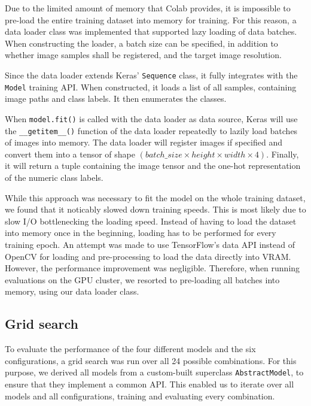 \documentclass{l4proj}
\begin{document}
Due to the limited amount of memory that Colab provides, it is impossible to pre-load the entire training dataset into memory for training. For this reason, a data loader class was implemented that supported lazy loading of data batches. When constructing the loader, a batch size can be specified, in addition to whether image samples shall be registered, and the target image resolution. 

Since the data loader extends Keras' \lstinline{Sequence} class, it fully integrates with the \lstinline{Model} training API. When constructed, it loads a list of all samples, containing image paths and class labels. It then enumerates the classes.

When \lstinline{model.fit()} is called with the data loader as data source, Keras will use the \lstinline{__getitem__()} function of the data loader repeatedly to lazily load batches of images into memory. The data loader will register images if specified and convert them into a tensor of shape $(batch\_size \times height \times width \times 4)$. Finally, it will return a tuple containing the image tensor and the one-hot representation of the numeric class labels.

While this approach was necessary to fit the model on the whole training dataset, we found that it noticably slowed down training speeds. This is most likely due to slow I/O bottlenecking the loading speed. Instead of having to load the dataset into memory once in the beginning, loading has to be performed for every training epoch. An attempt was made to use TensorFlow's data API instead of OpenCV for loading and pre-processing to load the data directly into VRAM. However, the performance improvement was negligible. Therefore, when running evaluations on the GPU cluster, we resorted to pre-loading all batches into memory, using our data loader class.

\subsection{Grid search}
\label{gridsearch_impl}

To evaluate the performance of the four different models and the six configurations, a grid search was run over all 24 possible combinations. For this purpose, we derived all models from a custom-built superclass \lstinline{AbstractModel}, to ensure that they implement a common API. This enabled us to iterate over all models and all configurations, training and evaluating every combination.
\end{document}

